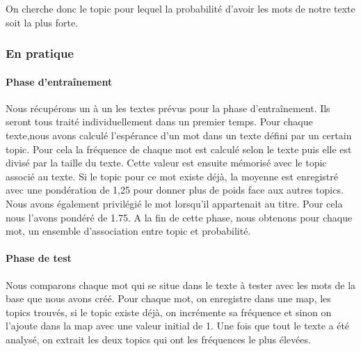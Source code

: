 On cherche donc le topic pour lequel la probabilité d'avoir les mots de notre texte soit la plus forte.


\subsubsection{En pratique}
\paragraph{Phase d'entraînement}  Nous récupérons un à un les textes prévus pour la phase d'entraînement. Ils seront tous traité individuellement dans un premier temps. Pour chaque texte,nous avons calculé l'espérance d'un mot dans un texte défini par un certain topic. Pour cela la fréquence de chaque mot est calculé selon le texte puis elle est divisé par la taille du texte. Cette valeur est ensuite mémorisé avec le topic associé au texte. Si le topic pour ce mot existe déjà, la moyenne est enregistré avec une pondération de 1,25 pour donner plus de poids face aux autres topics. Nous avons également privilégié le mot lorsqu'il appartenait au titre. Pour cela nous l'avons pondéré de 1.75. A la fin de cette phase, nous obtenons pour chaque mot, un ensemble d'association entre topic et probabilité. 


\paragraph{Phase de test}  Nous comparons chaque mot qui se situe dans le texte à tester avec les mots de la base que nous avons créé. Pour chaque mot, on enregistre dans une map, les topics trouvés, si le topic existe déjà, on incrémente sa fréquence et sinon on l'ajoute dans la map avec une valeur initial de 1. Une fois que tout le texte a été analysé, on extrait les deux topics qui ont les fréquences le plus élevées.
